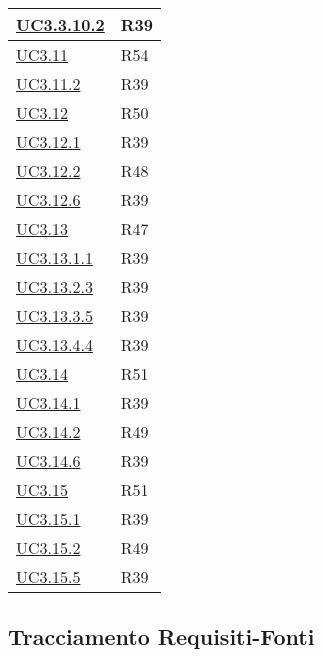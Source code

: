 \begin{longtable}{|P{6cm}|P{6cm}|}
	\hline \hyperref[UC3.10.2]{UC3.3.10.2} & R39 \\
	\hline \hyperref[UC3.11]{UC3.11} & R54 \\
	\hline \hyperref[UC3.11.2]{UC3.11.2} & R39 \\
	\hline \hyperref[UC3.12]{UC3.12} & R50 \\
	\hline \hyperref[UC3.12.1]{UC3.12.1} & R39 \\
	\hline \hyperref[UC3.12.2]{UC3.12.2} & R48 \\
	\hline \hyperref[UC3.12.6]{UC3.12.6} & R39 \\
	\hline \hyperref[UC3.13]{UC3.13} & R47 \\
	\hline \hyperref[UC3.13.1.1]{UC3.13.1.1} & R39 \\
	\hline \hyperref[UC3.13.2.3]{UC3.13.2.3} & R39 \\
	\hline \hyperref[UC3.13.3.5]{UC3.13.3.5} & R39 \\
	\hline \hyperref[UC3.13.4.4]{UC3.13.4.4} & R39 \\
	\hline \hyperref[UC3.14]{UC3.14} & R51 \\
	\hline \hyperref[UC3.14.1]{UC3.14.1} & R39 \\
	\hline \hyperref[UC3.14.2]{UC3.14.2} & R49 \\
	\hline \hyperref[UC3.14.6]{UC3.14.6} & R39 \\
	\hline \hyperref[UC3.15]{UC3.15} & R51 \\
	\hline \hyperref[UC3.15.1]{UC3.15.1} & R39 \\
	\hline \hyperref[UC3.15.2]{UC3.15.2} & R49 \\
	\hline \hyperref[UC3.15.5]{UC3.15.5} & R39 \\
	\hline
\end{longtable}

\subsection{Tracciamento Requisiti-Fonti}

